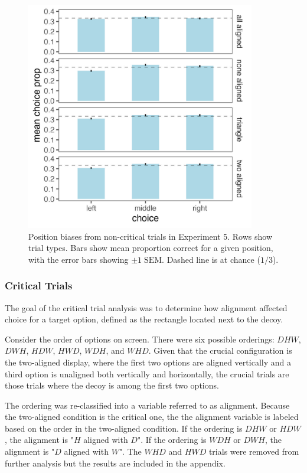 \begin{figure}
   \includegraphics[width=100mm]{figures/comparability_filler_position_bias.jpeg}
   \caption{Position biases from non-critical trials in Experiment 5. Rows show trial types. Bars show mean proportion correct for a given position, with the error bars showing $\pm1\;\text{SEM}$. Dashed line is at chance ($1/3$).}
   \label{fig:comparability_pos_bias}
\end{figure}


\subsubsection{Critical Trials}

The goal of the critical trial analysis was to determine how alignment affected choice for a target option, defined as the rectangle located next to the decoy.

Consider the order of options on screen. There were six possible orderings: $DHW$, $DWH$, $HDW$, $HWD$, $WDH$, and $WHD$. Given that the crucial configuration is the two-aligned display, where the first two options are aligned vertically and a third option is unaligned both vertically and horizontally, the crucial trials are those trials where the decoy is among the first two options. 

The ordering was re-classified into a variable referred to as alignment. Because the two-aligned condition is the critical one, the the alignment variable is labeled based on the order in the two-aligned condition. If the ordering is $DHW$ or $HDW$, the alignment is "$H$ aligned with $D$". If the ordering is $WDH$ or $DWH$, the alignment is "$D$ aligned with $W$". The $WHD$ and $HWD$ trials were removed from further analysis but the results are included in the appendix.

